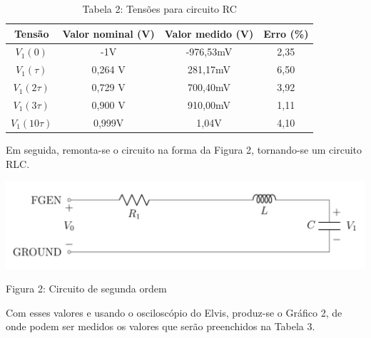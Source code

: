 \documentclass[a4 paper]{article}
\begin{document}
\vspace{5pt}
\begin{table}[h]
\centering
\begin{tabular}{|c|c|c|c|}
\hline
Tensão & Valor nominal (V) & Valor medido (V) & Erro (\%) \\\hline
$V_1(0)$ & -1V & -976,53mV &2,35\\    \hline
$V_1(\tau)$ & 0,264 V & 281,17mV &6,50 \\    \hline
$V_1(2\tau)$ & 0,729 V & 700,40mV &3,92 \\\hline
$V_1(3\tau)$ & 0,900 V & 910,00mV &1,11 \\\hline
$V_1(10\tau)$ & 0,999V & 1,04V &4,10 \\\hline
\end{tabular}
\caption*{Tabela 2: Tensões para circuito RC}
\end{table}





Em seguida, remonta-se o circuito na forma da Figura 2, tornando-se um circuito RLC.

\begin{table}[h]
\centering
\includegraphics[scale=0.3]{figuras/figura3}
\end{table}

\begin{center}
Figura 2: Circuito de segunda ordem
\end{center}






Com esses valores e usando o osciloscópio do Elvis, produz-se o Gráfico 2, de onde podem ser medidos os valores que serão preenchidos na Tabela 3. 
\end{document}
